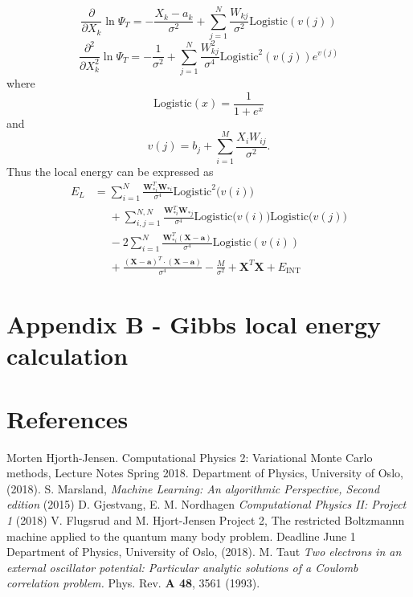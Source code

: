 \documentclass[norsk,a4paper,12pt]{article}
\begin{document}
\begin{equation}
\frac{\partial}{\partial X_k}\ln\Psi_T=-\frac{X_k-a_k}{\sigma^2}+\sum_{j=1}^{N}\frac{W_{kj}}{\sigma^2}\text{Logistic}(v(j))
\end{equation}
\begin{equation}
\frac{\partial^2}{\partial X_k^2}\ln\Psi_T=-\frac{1}{\sigma^2}+\sum_{j=1}^{N}\frac{W_{kj}^2}{\sigma^4}\text{Logistic}^2(v(j))e^{v(j)}
\end{equation}
where 
\begin{equation}
\text{Logistic}(x)=\frac{1}{1+e^x}
\end{equation}
and
\begin{equation}
v(j)=b_j+\sum_{i=1}^{M}\frac{X_iW_{ij}}{\sigma^2}.
\end{equation}
Thus the local energy can be expressed as
\begin{align}
E_L&=\sum_{i=1}^{N}\frac{\boldsymbol{W}_{*i}^T\boldsymbol{W}_{*i}}{\sigma^4}\text{Logistic}^2\big(v(i)\big)\\
&\phantom{=}+\sum_{i,j=1}^{N,N}\frac{\boldsymbol{W}_{*i}^T\boldsymbol{W}_{*j}}{\sigma^4}\text{Logistic}\big(v(i)\big)\text{Logistic}\big(v(j)\big)\\
&\phantom{=}-2\sum_{i=1}^N\frac{\boldsymbol{W}_{*i}^T(\boldsymbol{X}-\boldsymbol{a})}{\sigma^4}\text{Logistic}(v(i))\\
&\phantom{=}+\frac{(\boldsymbol{X}-\boldsymbol{a})^T\cdot(\boldsymbol{X}-\boldsymbol{a})}{\sigma^4}-\frac{M}{\sigma^2}+\boldsymbol{X}^T\boldsymbol{X}+E_{\text{INT}}
\end{align}

\section{Appendix B - Gibbs local energy calculation} \label{sec:appendix_B}


\newpage
\section{References}

\begingroup
\renewcommand{\section}[2]{}
\begin{thebibliography}{}
	Morten Hjorth-Jensen.
	Computational Physics 2: Variational Monte Carlo methods, Lecture Notes Spring 2018.
	Department of Physics, University of Oslo,
	(2018).
	S. Marsland, \emph{Machine Learning: An algorithmic Perspective, Second edition} (2015)
	 D. Gjestvang, E. M. Nordhagen \emph{Computational Physics II: Project 1} (2018)
	 V. Flugsrud and M. Hjort-Jensen
	 Project 2, The restricted Boltzmannn machine applied to the quantum many body problem. Deadline June 1
	 Department of Physics, University of Oslo,
	 (2018).
	 M. Taut \emph{Two electrons in an external oscillator potential: Particular analytic solutions of a Coulomb correlation problem.} Phys. Rev. \textbf{A 48}, 3561 (1993).

	
	
\end{thebibliography}
\endgroup
\end{document}

